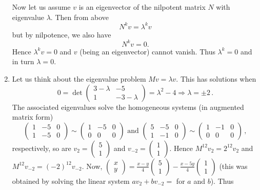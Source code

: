 \begin{enumerate}
Now let us assume $v$ is an eigenvector of the nilpotent matrix $N$ with eigenvalue $\lambda$. Then from above
\[
N^k v = \lambda^k v
\]
but by nilpotence, we also have
\[
N^k v = 0.
\]
Hence $\lambda^k v = 0$ and $v$ (being an eigenvector) cannot vanish. Thus $\lambda^k=0$ and in turn $\lambda=0$.

\item Let us think about the eigenvalue problem $Mv=\lambda v$. This has solutions when
\[
0=\det\begin{pmatrix}3-\lambda & -5 \\ 1 & -3-\lambda\end{pmatrix}=\lambda^2-4\Rightarrow \lambda = \pm 2\, .
\]
The associated eigenvalues solve the homogeneous systems (in augmented matrix form)
\[
\left(\begin{array}{cc|c}1 & -5 & 0\\ 1 & -5 & 0\end{array}\right)\sim 
\left(\begin{array}{cc|c} 1 & -5 & 0\\ 0 & 0 & 0\end{array}\right)
\mbox{ and }
\left(\begin{array}{cc|c} 5 & -5 & 0\\ 1 & -1 & 0\end{array}\right)\sim 
\left(\begin{array}{cc|c} 1 & -1 & 0\\ 0 & 0 & 0\end{array}\right)\, ,\]
respectively, so are $v_2=\begin{pmatrix} 5 \\ 1 \end{pmatrix}$ and $v_{-2} = \begin{pmatrix} 1 \\ 1 \end{pmatrix}$.
Hence $M^{12} v_2 = 2^{12} v_2$ and $M^{12}v_{-2} = (-2)^{12} v_{-2}$. Now, $\begin{pmatrix} x \\ y \end{pmatrix}=\frac{x-y}{4}\begin{pmatrix} 5 \\ 1 \end{pmatrix} -\frac{x-5y}4  \begin{pmatrix} 1 \\ 1 \end{pmatrix}$
(this was obtained by solving the linear system $a v_2 + b v_{-2} = $ for $a$ and $b$). 
Thus
\begin{gather*}

\end{gather*}
\end{enumerate}

